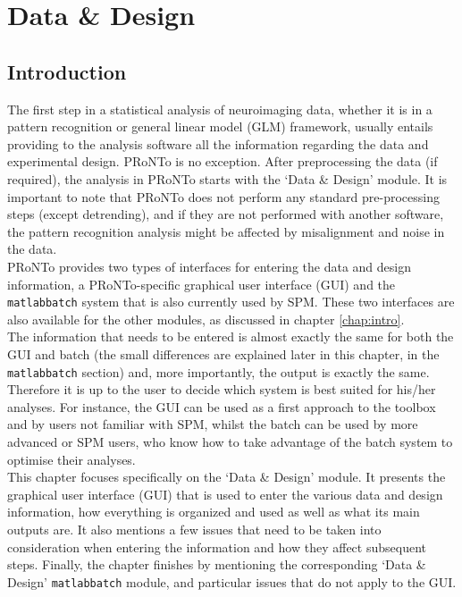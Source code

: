 %

\chapter{Data \& Design}
\label{chap:DataDesign}
\minitoc

\section{Introduction}

The first step in a statistical analysis of neuroimaging data,  whether it is in a pattern recognition or general linear model (GLM) framework, usually entails providing to the analysis software all the information regarding the data and experimental design. PRoNTo is no exception. After preprocessing the data (if required), the analysis in PRoNTo starts with the `Data \& Design' module. It is important to note that PRoNTo does not perform any standard pre-processing steps (except detrending), and if they are not performed with another software, the pattern recognition analysis might be affected by misalignment and noise in the data.
\\

PRoNTo provides two types of interfaces for entering the data and design information, a PRoNTo-specific graphical user interface (GUI) and the  {\tt matlabbatch} system that is also currently used by SPM. These two interfaces are also available for the other modules, as discussed in chapter \ref{chap:intro}.
\\

The information that needs to be entered is almost exactly the same for both the GUI and batch (the small differences are explained later in this chapter, in the  {\tt matlabbatch} section) and, more importantly, the output is exactly the same. Therefore it is up to the user to decide which system is best suited for his/her analyses. For instance, the GUI can be used as a first approach to the toolbox and by users not familiar with SPM, whilst the batch can be used by more advanced or SPM users, who know how to take advantage of the batch system to optimise their analyses.
\\

This chapter focuses specifically on the `Data \& Design' module. It presents the graphical user interface (GUI) that is used to enter the various data and design information, how everything is organized and used as well as what its main outputs are. It also mentions a few issues that need to be taken into consideration when entering the information and how they affect subsequent steps. Finally, the chapter finishes by mentioning the corresponding `Data \& Design' {\tt matlabbatch} module, and particular issues that do not apply to the GUI.
\\

